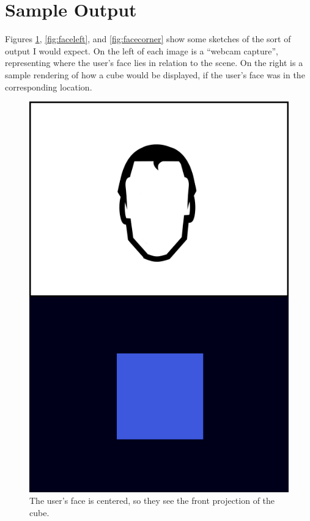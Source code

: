 \section{Sample Output}
Figures \ref{fig:facecenter}, \ref{fig:faceleft}, and
\ref{fig:facecorner} show some sketches of the sort of output I would
expect. On the left of each image is a ``webcam capture'',
representing where the user's face lies in relation to the scene. On
the right is a sample rendering of how a cube would be displayed, if
the user's face was in the corresponding location.

\begin{figure}
  \centering
  \includegraphics[scale=0.3]{images/head-center}
  \caption{The user's face is centered, so they see the front
    projection of the cube.}
  \label{fig:facecenter}
\end{figure}


